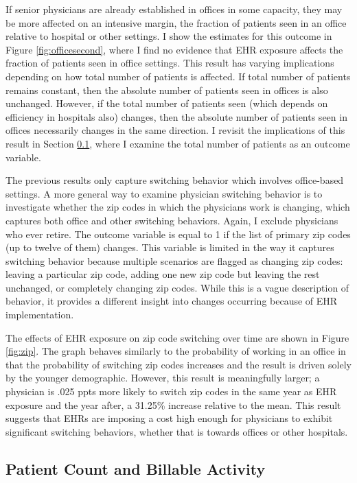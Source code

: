 \documentclass[11pt]{article}
\begin{document}
If senior physicians are already established in offices in some capacity, they may be more affected on an intensive margin, the fraction of patients seen in an office relative to hospital or other settings. I show the estimates for this outcome in Figure \ref{fig:officesecond}, where I find no evidence that EHR exposure affects the fraction of patients seen in office settings. This result has varying implications depending on how total number of patients is affected. If total number of patients remains constant, then the absolute number of patients seen in offices is also unchanged. However, if the total number of patients seen (which depends on efficiency in hospitals also) changes, then the absolute number of patients seen in offices necessarily changes in the same direction. I revisit the implications of this result in Section \ref{sec:patientcount}, where I examine the total number of patients as an outcome variable.


The previous results only capture switching behavior which involves office-based settings. A more general way to examine physician switching behavior is to investigate whether the zip codes in which the physicians work is changing, which captures both office and other switching behaviors. Again, I exclude physicians who ever retire. The outcome variable is equal to 1 if the list of primary zip codes (up to twelve of them) changes. This variable is limited in the way it captures switching behavior because multiple scenarios are flagged as changing zip codes: leaving a particular zip code, adding one new zip code but leaving the rest unchanged, or completely changing zip codes. While this is a vague description of behavior, it provides a different insight into changes occurring because of EHR implementation.

The effects of EHR exposure on zip code switching over time are shown in Figure \ref{fig:zip}. The graph behaves similarly to the probability of working in an office in that the probability of switching zip codes increases and the result is driven solely by the younger demographic. However, this result is meaningfully larger; a physician is .025 ppts more likely to switch zip codes in the same year as EHR exposure and the year after, a 31.25\% increase relative to the mean. This result suggests that EHRs are imposing a cost high enough for physicians to exhibit significant switching behaviors, whether that is towards offices or other hospitals.




\subsection{Patient Count and Billable Activity}\label{sec:patientcount}
\end{document}
